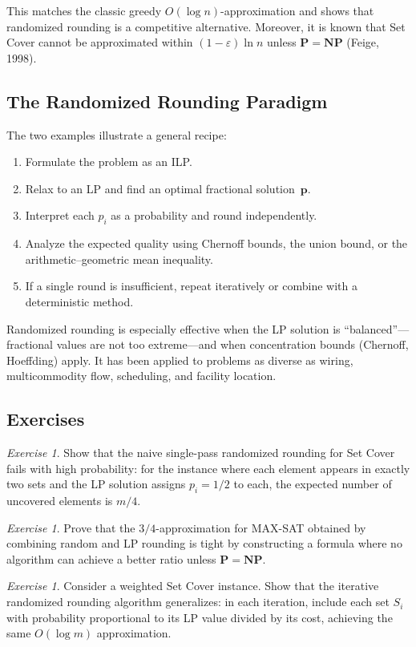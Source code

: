 \documentclass[twoside,12pt]{book}
\theoremstyle{plain}
\theoremstyle{definition}
\theoremstyle{remark}
\newtheorem{exercise}[theorem]{Exercise}
\begin{document}
This matches the classic greedy $O(\log n)$-approximation and shows
that randomized rounding is a competitive alternative.  Moreover, it
is known that Set Cover cannot be approximated within
$(1-\varepsilon)\ln n$ unless $\mathbf{P} = \mathbf{NP}$ (Feige,
1998).

\subsection{The Randomized Rounding Paradigm}

The two examples illustrate a general recipe:
\begin{enumerate}
\item Formulate the problem as an ILP.
\item Relax to an LP and find an optimal fractional solution~$\mathbf{p}$.
\item Interpret each $p_i$ as a probability and round independently.
\item Analyze the expected quality using Chernoff bounds, the
      union bound, or the arithmetic--geometric mean inequality.
\item If a single round is insufficient, repeat iteratively or
      combine with a deterministic method.
\end{enumerate}

Randomized rounding is especially effective when the LP solution is
``balanced''---fractional values are not too extreme---and when
concentration bounds (Chernoff, Hoeffding) apply.  It has been
applied to problems as diverse as wiring, multicommodity flow,
scheduling, and facility location.

\subsection{Exercises}

\begin{exercise}
Show that the naive single-pass randomized rounding for Set Cover
fails with high probability: for the instance where each element
appears in exactly two sets and the LP solution assigns $p_i = 1/2$
to each, the expected number of uncovered elements is $m/4$.
\end{exercise}

\begin{exercise}
Prove that the $3/4$-approximation for MAX-SAT obtained by combining
random and LP rounding is tight by constructing a formula where
no algorithm can achieve a better ratio unless $\mathbf{P} = \mathbf{NP}$.
\end{exercise}

\begin{exercise}
Consider a weighted Set Cover instance.  Show that the iterative
randomized rounding algorithm generalizes: in each iteration,
include each set $S_i$ with probability proportional to its LP value
divided by its cost, achieving the same $O(\log m)$ approximation.
\end{exercise}
\end{document}
